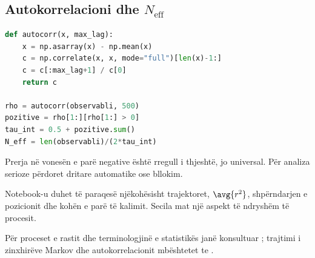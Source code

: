 \subsection{Autokorrelacioni dhe $N_{\mathrm{eff}}$}
\begin{lstlisting}[language=Python,caption={Vlerësim fillestar i kohës së integruar të autokorrelacionit.}]
def autocorr(x, max_lag):
    x = np.asarray(x) - np.mean(x)
    c = np.correlate(x, x, mode="full")[len(x)-1:]
    c = c[:max_lag+1] / c[0]
    return c

rho = autocorr(observabli, 500)
pozitive = rho[1:][rho[1:] > 0]
tau_int = 0.5 + pozitive.sum()
N_eff = len(observabli)/(2*tau_int)
\end{lstlisting}
Prerja në vonesën e parë negative është rregull i thjeshtë, jo universal. Për analiza serioze përdoret dritare automatike ose bllokim.

\begin{lidhje}
Notebook-u duhet të paraqesë njëkohësisht trajektoret, $\avg{r^2}$, shpërndarjen e pozicionit dhe kohën e parë të kalimit. Secila mat një aspekt të ndryshëm të procesit.
\end{lidhje}

Për proceset e rastit dhe terminologjinë e statistikës janë konsultuar \cite{capollari,butka,tasho}; trajtimi i zinxhirëve Markov dhe autokorrelacionit mbështetet te \cite{robert,krauth}.

